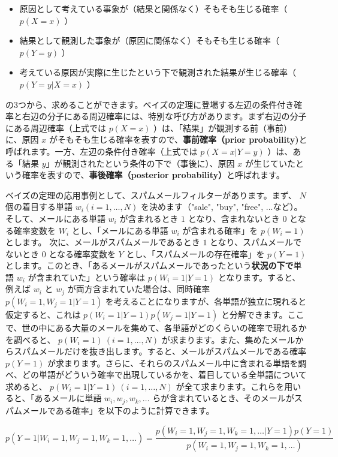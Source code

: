 \begin{itemize}
\item 原因として考えている事象が（結果と関係なく）そもそも生じる確率（ $p(X = x)$ ）
\item 結果として観測した事象が（原因に関係なく）そもそも生じる確率（ $p(Y = y)$ ）
\item 考えている原因が実際に生じたという下で観測された結果が生じる確率（ $p(Y = y | X = x)$ ）
\end{itemize}


の3つから、求めることができます。ベイズの定理に登場する左辺の条件付き確率と右辺の分子にある周辺確率には、特別な呼び方があります。まず右辺の分子にある周辺確率（上式では $p(X = x)$ ）は、「結果」が観測する前（事前）に、原因 $x$ がそもそも生じる確率を表すので、\textbf{事前確率（prior probability)}と呼ばれます。一方、左辺の条件付き確率（上式では $p(X = x | Y = y)$ ）は、ある「結果 $y$」が観測されたという条件の下で（事後に）、原因 $x$ が生じていたという確率を表すので、\textbf{事後確率（posterior probability）}と呼ばれます。


ベイズの定理の応用事例として、スパムメールフィルターがあります。まず、 $N$ 個の着目する単語 $w_i (i=1, \dots, N)$ を決めます（"sale", "buy", "free", ...など）。そして、メールにある単語 $w_i$ が含まれるとき $1$ となり、含まれないとき $0$ となる確率変数を $W_i$ とし、「メールにある単語 $w_i$ が含まれる確率」を $p(W_i = 1)$ とします。 次に、メールがスパムメールであるとき $1$ となり、スパムメールでないとき $0$ となる確率変数を $Y$ とし、「スパムメールの存在確率」を $p(Y = 1)$ とします。このとき、「あるメールがスパムメールであったという\textbf{状況の下で}単語 $w_i$ が含まれていた」という確率は $p(W_i = 1 | Y = 1)$ となります。すると、例えば $w_i$ と $w_j$ が両方含まれていた場合は、同時確率 $p(W_i = 1, W_j = 1 | Y = 1)$ を考えることになりますが、各単語が独立に現れると仮定すると、これは $p(W_i = 1 | Y = 1) p(W_j = 1 | Y = 1)$ と分解できます。ここで、世の中にある大量のメールを集めて、各単語がどのくらいの確率で現れるかを調べると、 $p(W_i = 1) \ (i=1,\dots,N)$ が求まります。また、集めたメールからスパムメールだけを抜き出します。すると、メールがスパムメールである確率 $p(Y = 1)$ が求まります。さらに、それらのスパムメール中に含まれる単語を調べ、どの単語がどういう確率で出現しているかを、着目している全単語について求めると、 $p(W_i = 1 | Y = 1) \ (i=1, \dots, N)$ が全て求まります。これらを用いると、「あるメールに単語 $w_i, w_j, w_k, \dots$ らが含まれているとき、そのメールがスパムメールである確率」を以下のように計算できます。


\[
p(Y = 1 | W_i = 1, W_j = 1, W_k = 1, \dots ) = \frac{p(W_i = 1, W_j = 1, W_k = 1, \dots | Y = 1) p(Y = 1)}{p(W_i = 1, W_j = 1, W_k = 1, \dots )}
\]


